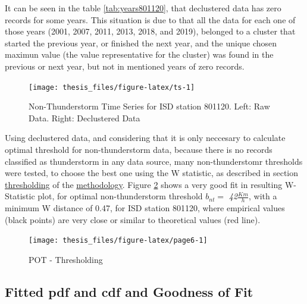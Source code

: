 \documentclass[12pt,oneside]{reedthesis}
\begin{document}
It can be seen in the table \ref{tab:years801120}, that declustered data has zero records for some years. This situation is due to that all the data for each one of those years (2001, 2007, 2011, 2013, 2018, and 2019), belonged to a cluster that started the previous year, or finished the next year, and the unique chosen maximun value (the value representative for the cluster) was found in the previous or next year, but not in mentioned years of zero records.
\begin{figure}

{\centering \texttt{[image: thesis\_files/figure-latex/ts-1]} 

}

\caption{Non-Thunderstorm Time Series for ISD station 801120. Left: Raw Data. Right: Declustered Data}\label{fig:ts}
\end{figure}
Using declustered data, and considering that it is only neccesary to calculate optimal threshold for non-thunderstorm data, because there is no records classified as thunderstorm in any data source, many non-thunderstomr thresholds were tested, to choose the best one using the W statistic, as described in section \protect\hyperlink{thresholding}{thresholding} of the \protect\hyperlink{rmd-method}{methodology}. Figure \ref{fig:page6} shows a very good fit in resulting W-Statistic plot, for optimal non-thunderstorm threshold \(b_{nt} =\) \emph{42}\(\frac{Km}{h}\), with a minimum W distance of 0.47, for ISD station 801120, where empirical values (black points) are very close or similar to theoretical values (red line).

\footnotesize
\begin{figure}

{\centering \texttt{[image: thesis\_files/figure-latex/page6-1]} 

}

\caption{POT - Thresholding}\label{fig:page6}
\end{figure}
\normalsize

\hypertarget{fitted-pdf-and-cdf-and-goodness-of-fit}{%
\subsection{Fitted pdf and cdf and Goodness of Fit}\label{fitted-pdf-and-cdf-and-goodness-of-fit}}
\end{document}
